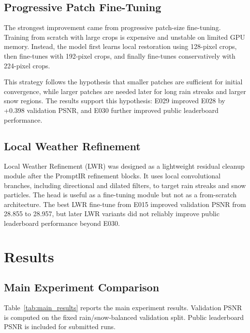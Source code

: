 \documentclass[10pt,conference]{article}
\begin{document}
\subsection{Progressive Patch Fine-Tuning}

The strongest improvement came from progressive patch-size fine-tuning. Training from scratch with large crops is expensive and unstable on limited GPU memory. Instead, the model first learns local restoration using 128-pixel crops, then fine-tunes with 192-pixel crops, and finally fine-tunes conservatively with 224-pixel crops.

This strategy follows the hypothesis that smaller patches are sufficient for initial convergence, while larger patches are needed later for long rain streaks and larger snow regions. The results support this hypothesis: E029 improved E028 by +0.398 validation PSNR, and E030 further improved public leaderboard performance.

\subsection{Local Weather Refinement}

Local Weather Refinement (LWR) was designed as a lightweight residual cleanup module after the PromptIR refinement blocks. It uses local convolutional branches, including directional and dilated filters, to target rain streaks and snow particles. The head is useful as a fine-tuning module but not as a from-scratch architecture. The best LWR fine-tune from E015 improved validation PSNR from 28.855 to 28.957, but later LWR variants did not reliably improve public leaderboard performance beyond E030.

\section{Results}

\subsection{Main Experiment Comparison}

Table~\ref{tab:main_results} reports the main experiment results. Validation PSNR is computed on the fixed rain/snow-balanced validation split. Public leaderboard PSNR is included for submitted runs.
\end{document}
